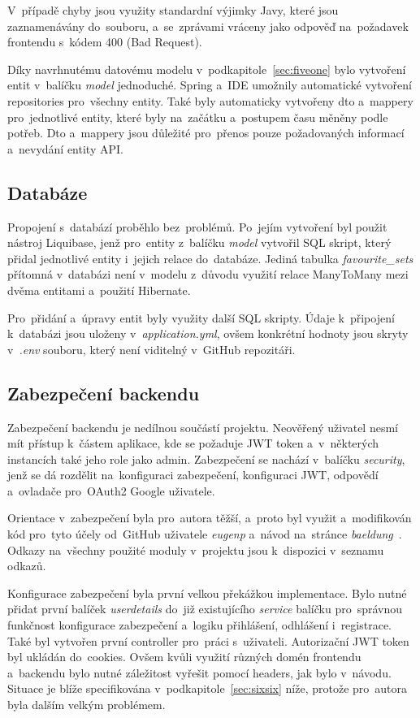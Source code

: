 \documentclass[twoside]{ctuthesis}
\begin{document}
V~případě chyby jsou využity standardní výjimky Javy, které jsou zaznamenávány do~souboru, a~se~zprávami vráceny jako odpověď na~požadavek frontendu s~kódem 400 (Bad Request).
\newpage

Díky navrhnutému datovému modelu v~podkapitole~\ref{sec:fiveone} bylo vytvoření entit v~balíčku \emph{model} jednoduché. Spring a~IDE umožnily automatické vytvoření repositories pro~všechny entity. Také byly automaticky vytvořeny dto a~mappery pro~jednotlivé entity, které byly na~začátku a~postupem času měněny podle potřeb. Dto a~mappery jsou důležité pro~přenos pouze požadovaných informací a~nevydání entity API.

\subsection{Databáze}

Propojení s~databází proběhlo bez~problémů. Po~jejím vytvoření byl použit nástroj Liquibase, jenž pro~entity z~balíčku \emph{model} vytvořil SQL skript, který přidal jednotlivé entity i~jejich relace do~databáze. Jediná tabulka \emph{favourite\_sets} přítomná v~databázi není v~modelu z~důvodu využití relace ManyToMany mezi dvěma entitami a~použití Hibernate.

Pro~přidání a~úpravy entit byly využity další SQL skripty. Údaje k~připojení k~databázi jsou uloženy v~\emph{application.yml}, ovšem konkrétní hodnoty jsou skryty v~\emph{.env} souboru, který není viditelný v~GitHub repozitáři.

\subsection{Zabezpečení backendu}

Zabezpečení backendu je nedílnou součástí projektu. Neověřený uživatel nesmí mít přístup k~částem aplikace, kde se požaduje JWT token a~v~některých instancích také jeho role jako admin. Zabezpečení se nachází v~balíčku \emph{security}, jenž se dá rozdělit na~konfiguraci zabezpečení, konfiguraci JWT, odpovědí a~ovladače pro~OAuth2 Google uživatele.

Orientace v~zabezpečení byla pro~autora těžší, a~proto byl využit a~modifikován kód pro~tyto účely od~GitHub uživatele \emph{eugenp} a~návod na~stránce \emph{baeldung}~\cite{baeldungspring}. Odkazy na~všechny použité moduly v~projektu jsou k~dispozici v~seznamu odkazů.

Konfigurace zabezpečení byla první velkou překážkou implementace. Bylo nutné přidat první balíček \emph{userdetails} do~již existujícího \emph{service} balíčku pro~správnou funkčnost konfigurace zabezpečení a~logiku přihlášení, odhlášení i~registrace. Také byl vytvořen první controller pro~práci s~uživateli. Autorizační JWT token byl ukládán do~cookies. Ovšem kvůli využití různých domén frontendu a~backendu bylo nutné záležitost vyřešit pomocí headers, jak bylo v~návodu. Situace je blíže specifikována v~podkapitole~\ref{sec:sixsix} níže, protože pro~autora byla dalším velkým problémem.
\end{document}
